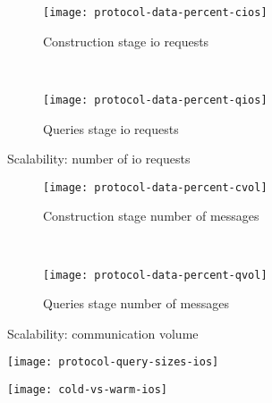 \begin{figure}[ht!]
	\captionsetup{justification=centering}
	\centering
	\begin{subfigure}[t]{0.5\textwidth}
		\centering
		\texttt{[image: protocol-data-percent-cios]}
		\caption{Construction stage \acrshort{io} requests}%
		\label{figure:protocols-data-percent-ios:c}
	\end{subfigure}%
	~ %
	\begin{subfigure}[t]{0.5\textwidth}
		\centering
		\texttt{[image: protocol-data-percent-qios]}
		\caption{Queries stage \acrshort{io} requests}%
		\label{figure:protocols-data-percent-ios:q}
	\end{subfigure}%
	\caption{Scalability: number of \acrshort{io} requests}%
	\label{figure:protocols-data-percent-ios}
\end{figure}

\begin{figure}[ht!]
	\captionsetup{justification=centering}
	\centering
	\begin{subfigure}[t]{0.5\textwidth}
		\centering
		\texttt{[image: protocol-data-percent-cvol]}
		\caption{Construction stage number of messages}%
		\label{figure:protocols-data-percent-vol:c}
	\end{subfigure}%
	~ %
	\begin{subfigure}[t]{0.5\textwidth}
		\centering
		\texttt{[image: protocol-data-percent-qvol]}
		\caption{Queries stage number of messages}%
		\label{figure:protocols-data-percent-vol:q}
	\end{subfigure}%
	\caption{Scalability: communication volume}%
	\label{figure:protocols-data-percent-vol}
\end{figure}

\begin{figure}[ht!]
	\centering
	\begin{minipage}{.5\textwidth}
		\captionsetup[figure]{justification=centering}
		\centering
		\texttt{[image: protocol-query-sizes-ios]}
		\label{figure:protocols-query-sizes}
	\end{minipage}%
	\begin{minipage}{.5\textwidth}
		\captionsetup[figure]{justification=centering}
		\centering
		\texttt{[image: cold-vs-warm-ios]}
		\label{figure:cold-vs-warm}
	\end{minipage}
\end{figure}
